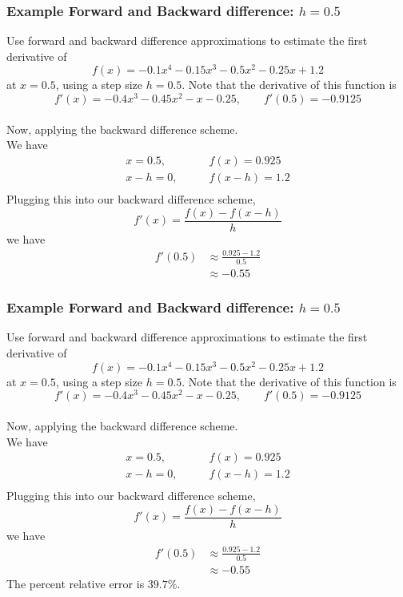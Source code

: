 \documentclass{if-beamer}
\begin{document}
\begin{frame}
\frametitle{Example Forward and Backward difference: $h= 0.5$}
Use forward and backward difference approximations to estimate the first derivative of
$$f(x) = -0.1x^4-0.15x^3-0.5x^2-0.25x+1.2 $$
at $x=0.5$, using a step size $h = 0.5$. Note that the derivative of this function is
$$f'(x) = -0.4x^3-0.45x^2-x-0.25, \qquad f'(0.5) = -0.9125$$
\\\vspace{5pt}
Now, applying the backward difference scheme.\\\vspace{5pt}
We have
\begin{align*}
x = 0.5, \qquad &f(x) = 0.925\\
x-h = 0, \qquad &f(x-h) = 1.2\\
\end{align*}
Plugging this into our backward difference scheme, 
$$f'(x) = \frac{f(x)-f(x-h)}{h} $$
we have
\begin{align*}
f'(0.5) &\approx \frac{0.925-1.2}{0.5} \\
&\approx -0.55
\end{align*}
\end{frame}


\begin{frame}
\frametitle{Example Forward and Backward difference: $h= 0.5$}
Use forward and backward difference approximations to estimate the first derivative of
$$f(x) = -0.1x^4-0.15x^3-0.5x^2-0.25x+1.2 $$
at $x=0.5$, using a step size $h = 0.5$. Note that the derivative of this function is
$$f'(x) = -0.4x^3-0.45x^2-x-0.25, \qquad f'(0.5) = -0.9125$$
\\\vspace{5pt}
Now, applying the backward difference scheme.\\\vspace{5pt}
We have
\begin{align*}
x = 0.5, \qquad &f(x) = 0.925\\
x-h = 0, \qquad &f(x-h) = 1.2\\
\end{align*}
Plugging this into our backward difference scheme, 
$$f'(x) = \frac{f(x)-f(x-h)}{h} $$
we have
\begin{align*}
f'(0.5) &\approx \frac{0.925-1.2}{0.5} \\
&\approx -0.55
\end{align*}
The percent relative error is $39.7\%$.
\end{frame}
\end{document}
